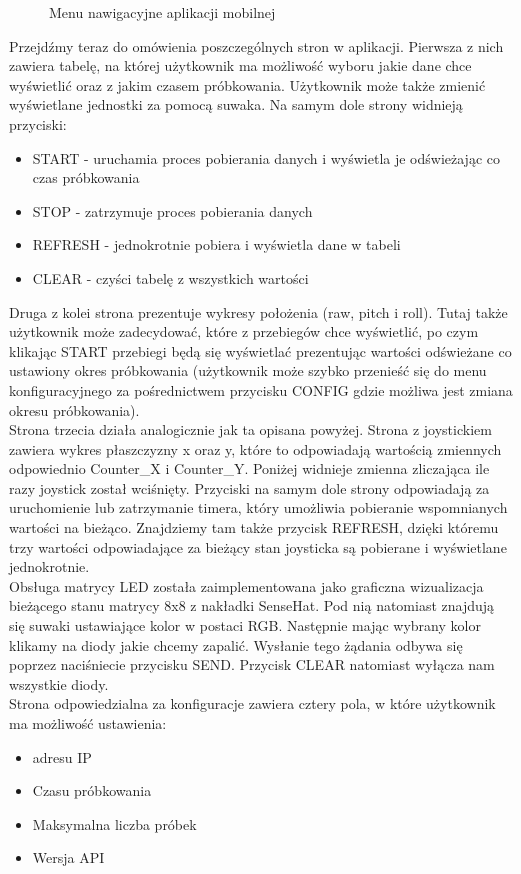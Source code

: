 \documentclass[11pt, a4paper]{article}
\begin{document}
\begin{figure}[H]
	\caption{Menu nawigacyjne aplikacji mobilnej}
	\label{fig:fig2}
\end{figure}

Przejdźmy teraz do omówienia poszczególnych stron w aplikacji. Pierwsza z nich zawiera tabelę, na której użytkownik ma możliwość wyboru jakie dane chce wyświetlić oraz z jakim czasem próbkowania. Użytkownik może także zmienić wyświetlane jednostki za pomocą suwaka. Na samym dole strony widnieją przyciski:
\begin{itemize}
\item START - uruchamia proces pobierania danych i wyświetla je odświeżając co czas próbkowania
\item STOP - zatrzymuje proces pobierania danych
\item REFRESH - jednokrotnie pobiera i wyświetla dane w tabeli
\item CLEAR - czyści tabelę z wszystkich wartości
\end{itemize} 

Druga z kolei strona prezentuje wykresy położenia (raw, pitch i roll). Tutaj także użytkownik może zadecydować, które z przebiegów chce wyświetlić, po czym klikając START przebiegi będą się wyświetlać prezentując wartości odświeżane co ustawiony okres próbkowania (użytkownik może szybko przenieść się do menu konfiguracyjnego za pośrednictwem przycisku CONFIG gdzie możliwa jest zmiana okresu próbkowania). \\
Strona trzecia działa analogicznie jak ta opisana powyżej.
\newpage
Strona z joystickiem zawiera wykres płaszczyzny x oraz y, które to odpowiadają wartością zmiennych odpowiednio Counter\_X i Counter\_Y. Poniżej widnieje zmienna zliczająca ile razy joystick został wciśnięty. Przyciski na samym dole strony odpowiadają za uruchomienie lub zatrzymanie timera, który umożliwia pobieranie wspomnianych wartości na bieżąco. Znajdziemy tam także przycisk REFRESH, dzięki któremu trzy wartości odpowiadające za bieżący stan joysticka są pobierane i wyświetlane jednokrotnie. \\
Obsługa matrycy LED została zaimplementowana jako graficzna wizualizacja bieżącego stanu matrycy 8x8 z nakładki SenseHat. Pod nią natomiast znajdują się suwaki ustawiające kolor w postaci RGB. Następnie mając wybrany kolor klikamy na diody jakie chcemy zapalić. Wysłanie tego żądania odbywa się poprzez naciśniecie przycisku SEND. Przycisk CLEAR natomiast wyłącza nam wszystkie diody. \\
Strona odpowiedzialna za konfiguracje zawiera cztery pola, w które użytkownik ma możliwość ustawienia:
\begin{itemize}
\item adresu IP
\item Czasu próbkowania
\item Maksymalna liczba próbek
\item Wersja API
\end{itemize} 
\end{document}
